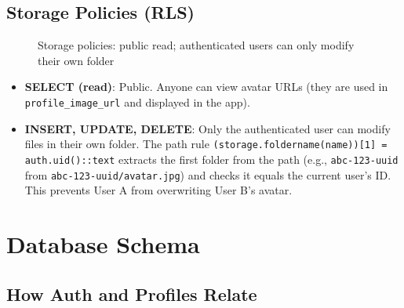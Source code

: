 \documentclass[11pt,a4paper]{article}
\begin{document}
\subsection{Storage Policies (RLS)}

\begin{figure}[h]
\centering
{}
\caption{Storage policies: public read; authenticated users can only modify their own folder}
\end{figure}

\begin{itemize}[leftmargin=*]
    \item \textbf{SELECT (read)}: Public. Anyone can view avatar URLs (they are used in \texttt{profile\_image\_url} and displayed in the app).
    \item \textbf{INSERT, UPDATE, DELETE}: Only the authenticated user can modify files in their own folder. The path rule \texttt{(storage.foldername(name))[1] = auth.uid()::text} extracts the first folder from the path (e.g., \texttt{abc-123-uuid} from \texttt{abc-123-uuid/avatar.jpg}) and checks it equals the current user's ID. This prevents User A from overwriting User B's avatar.
\end{itemize}

\section{Database Schema}

\subsection{How Auth and Profiles Relate}
\end{document}
